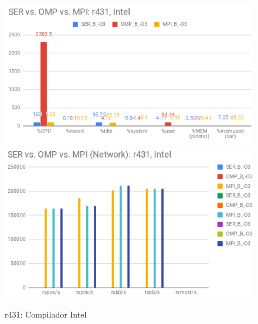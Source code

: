 \documentclass{article}
\begin{document}
\begin{appendices}
\begin{figure}[H]
    \centering
    \includegraphics[width=12cm]{Pictures/FT_SER_OMP_MPI_r431_Intel_Comp.png}
    \includegraphics[width=12cm]{Pictures/FT_SER_OMP_MPI_r431_Intel_Comm.png}
    \caption{r431: Compilador Intel}
    \label{fig:ft_ser_omp_mpi_r431_intel}
\end{figure}


\end{appendices}
\end{document}
